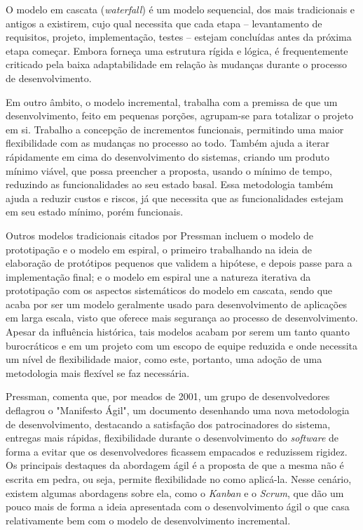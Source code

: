 O modelo em cascata (\textit{waterfall}) é um modelo sequencial, dos mais
tradicionais e antigos a existirem, cujo qual necessita que cada etapa --
levantamento de requisitos, projeto, implementação, testes -- estejam
concluídas antes da próxima etapa começar. Embora forneça uma estrutura rígida
e lógica, é frequentemente criticado pela baixa adaptabilidade em relação às
mudanças durante o processo de desenvolvimento.

Em outro âmbito, o modelo incremental, trabalha com a premissa de que um
desenvolvimento, feito em pequenas porções, agrupam-se para totalizar o projeto
em si. Trabalho a concepção de incrementos funcionais, permitindo uma maior
flexibilidade com as mudanças no processo ao todo. Também ajuda a iterar
rápidamente em cima do desenvolvimento do sistemas, criando um produto mínimo
viável, que possa preencher a proposta, usando o mínimo de tempo, reduzindo as
funcionalidades ao seu estado basal. Essa metodologia também ajuda a reduzir
custos e riscos, já que necessita que as funcionalidades estejam em seu estado
mínimo, porém funcionais.

Outros modelos tradicionais citados por Pressman incluem o modelo de
prototipação e o modelo em espiral, o primeiro trabalhando na ideia de
elaboração de protótipos pequenos que validem a hipótese, e depois passe para a
implementação final; e o modelo em espiral une a natureza iterativa da
prototipação com os aspectos sistemáticos do modelo em cascata, sendo que acaba
por ser um modelo geralmente usado para desenvolvimento de aplicações em larga
escala, visto que oferece mais segurança ao processo de desenvolvimento. Apesar
da influência histórica, tais modelos acabam por serem um tanto quanto
burocráticos e em um projeto com um escopo de equipe reduzida e onde necessita
um nível de flexibilidade maior, como este, portanto, uma adoção de uma
metodologia mais flexível se faz necessária.

Pressman, comenta que, por meados de 2001, um grupo de desenvolvedores
deflagrou o "Manifesto Ágil", um documento desenhando uma nova metodologia de
desenvolvimento, destacando a satisfação dos patrocinadores do sistema,
entregas mais rápidas, flexibilidade durante o desenvolvimento do
\textit{software} de forma a evitar que os desenvolvedores ficassem empacados e
reduzissem rigidez. Os principais destaques da abordagem ágil é a proposta de
que a mesma não é escrita em pedra, ou seja, permite flexibilidade no como
aplicá-la. Nesse cenário, existem algumas abordagens sobre ela, como o
\textit{Kanban} e o \textit{Scrum}, que dão um pouco mais de forma a ideia
apresentada com o desenvolvimento ágil o que casa relativamente bem com o
modelo de desenvolvimento incremental.

